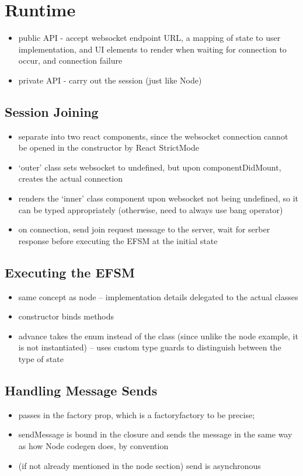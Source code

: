 \section{Runtime}
\label{section:reactruntime}

\begin{itemize}
\item public API - accept websocket endpoint URL, a mapping of state to user implementation, and UI elements to render when waiting for connection to occur, and connection failure
\item private API - carry out the session (just like Node)
\end{itemize}

\subsection{Session Joining}
\begin{itemize}
\item separate into two react components, since the websocket connection cannot be opened in the constructor by React StrictMode
\item `outer' class sets websocket to undefined, but upon componentDidMount, creates the actual connection
\item renders the `inner' class component upon websocket not being undefined, so it can be typed appropriately (otherwise, need to always use bang operator)
\item on connection, send join request message to the server, wait for serber response before executing the EFSM at the initial state
\end{itemize}

\subsection{Executing the EFSM}
\begin{itemize}
\item same concept as node -- implementation details delegated to the actual classes
\item constructor binds methods
\item advance takes the enum instead of the class (since unlike the node example, it is not instantiated) -- uses custom type guards to distinguish between the type of state
\end{itemize}

\subsection{Handling Message Sends}
\begin{itemize}
\item passes in the factory prop, which is a factoryfactory to be precise;
\item sendMessage is bound in the closure and sends the message in the same way as how Node codegen does, by convention
\item (if not already mentioned in the node section) send is asynchronous
\end{itemize}

